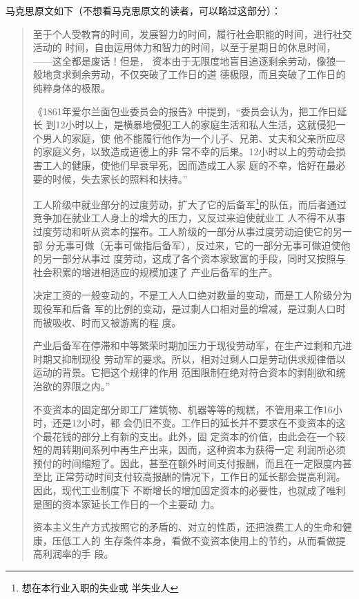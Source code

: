 马克思原文如下（不想看马克思原文的读者，可以略过这部分）：
\begin{quotation}

  至于个人受教育的时间，发展智力的时间，履行社会职能的时间，进行社交活动的
  时间，自由运用体力和智力的时间，以至于星期日的休息时间，——这全都是废话！但是，
  资本由于无限度地盲目追逐剩余劳动，像狼一般地贪求剩余劳动，不仅突破了工作日的道
  德极限，而且突破了工作日的纯粹身体的极限。

  《1861年爱尔兰面包业委员会的报告》中提到，“委员会认为，把工作日延长
  到12小时以上，是横暴地侵犯工人的家庭生活和私人生活，这就侵犯一个男人的家庭，使
  他不能履行他作为一个儿子、兄弟、丈夫和父亲所应尽的家庭义务，以致造成道德上的非
  常不幸的后果。12小时以上的劳动会损害工人的健康，使他们早衰早死，因而造成工人家
  庭的不幸，恰好在最必要的时候，失去家长的照料和扶持。”

  工人阶级中就业部分的过度劳动，扩大了它的后备军\footnote{想在本行业入职的失业或
    半失业人}的队伍，而后者通过竞争加在就业工人身上的增大的压力，又反过来迫使就业工
  人不得不从事过度劳动和听从资本的摆布。工人阶级的一部分从事过度劳动迫使它的另一部
  分无事可做（无事可做指后备军），反过来，它的一部分无事可做迫使他的另一部分从事过
  度劳动，这成了各个资本家致富的手段，同时又按照与社会积累的增进相适应的规模加速了
  产业后备军的生产。 

  决定工资的一般变动的，不是工人人口绝对数量的变动，而是工人阶级分为现役军和后备
  军的比例的变动，是过剩人口相对量的增减，是过剩人口时而被吸收、时而又被游离的程
  度。

  产业后备军在停滞和中等繁荣时期加压力于现役劳动军，在生产过剩和亢进时期又抑制现役
  劳动军的要求。所以，相对过剩人口是劳动供求规律借以运动的背景。它把这个规律的作用
  范围限制在绝对符合资本的剥削欲和统治欲的界限之内。”

  不变资本的固定部分即工厂建筑物、机器等等的规糕，不管用来工作16小时，还是12小时，都
  会仍旧不变。工作日的延长并不要求在不变资本的这个最花钱的部分上有新的支出。此外，固
  定资本的价值，由此会在一个较短的周转期间系列中再生产出来，因而，这种资本为获得一定
  利润所必须预付的时间缩短了。因此，甚至在额外时间支付报酬，而且在一定限度内甚至比
  正常劳动时间支付较高报酬的情况下，工作日的延长都会提高利润。因此，现代工业制度下
  不断增长的增加固定资本的必要性，也就成了唯利是图的资本家延长工作日的一个主要动
  力。 

  资本主义生产方式按照它的矛盾的、对立的性质，还把浪费工人的生命和健康，压低工人的
  生存条件本身，看做不变资本使用上的节约，从而看做提高利润率的手
  段。
\end{quotation}

